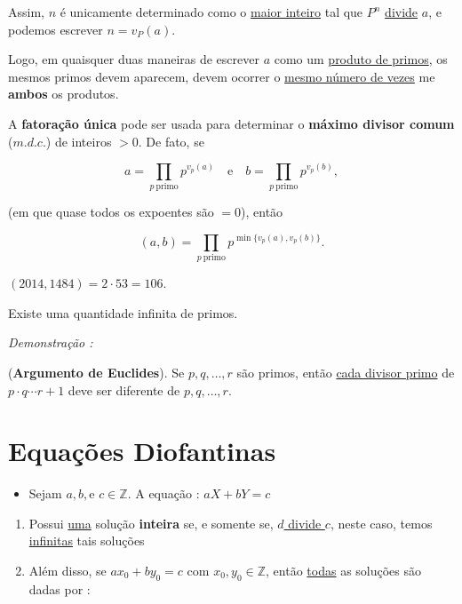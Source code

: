         Assim, $n$ é unicamente determinado como o \underline{maior inteiro} tal que $P^n$ \underline{divide} $a$, e podemos escrever $n = v_P(a)$. 

        Logo, em quaisquer duas maneiras de escrever $a$ como um \underline{produto de primos}, os mesmos primos devem aparecem, devem ocorrer o \underline{mesmo número de vezes} me \textbf{ambos} os produtos.  

        \begin{exemplo}
            A \textbf{fatoração única} pode ser usada para determinar o \textbf{máximo divisor comum} ($m.d.c.$) de inteiros $> 0$. 
            De fato, se 
            
            \[
            a = \prod_{p \ \text{primo}} p^{v_p(a)} 
            \quad \text{e} \quad 
            b = \prod_{p \ \text{primo}} p^{v_p(b)} ,
            \]
            
            (em que quase todos os expoentes são $= 0$), então
            
            \[
            (a, b) = \prod_{p \ \text{primo}} p^{\min\{v_p(a),v_p(b)\}}.
            \]  

            $(2014, 1484) = 2 \cdot 53 = 106$.
        \end{exemplo}

        \vspace{2cm}

        \begin{teorema}[5.10. : ]
            Existe uma quantidade infinita de primos.
        \end{teorema}

        \textit{Demonstração : }

        (\textbf{Argumento de Euclides}). Se $p, q, \ldots , r$ são primos, então \underline{cada divisor primo} de $p \cdot q \cdots r +1$
        deve ser diferente de $p, q, \ldots , r$.

        
\section{Equações Diofantinas}

    \begin{itemize}[left=0.5cm, align=left, nosep]
        \item Sejam $a,b, \text{e } c \in \mathbb{Z}$. A equação : $aX + bY = c$
    \end{itemize}

    \begin{enumerate}[label=\roman*., left=0.5cm, align=left, nosep]
        \item Possui \underline{uma} solução \textbf{inteira} se, e somente se, \underline{$d$ divide $c$}, neste caso, temos \underline{infinitas} 
        tais soluções 
        \item Além disso, se $ ax_0 + by_0 = c $ com $x_0,y_0 \in \mathbb{Z}$, então \underline{todas} as soluções são dadas por : 
    \end{enumerate}


